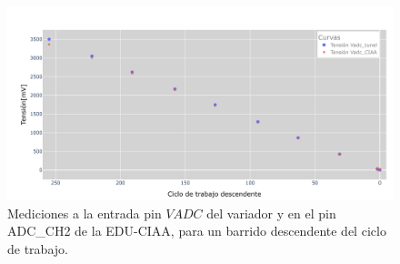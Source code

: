 \begin{figure}[H]
    \centering
    \includegraphics[width=1\linewidth]{Figuras/datalogger/Hardware/MedicionesPWM/pruebaTunelCiaaDes.png}
    \caption{Mediciones a la entrada pin $VADC$ del variador y en el pin ADC\_CH2 de la EDU-CIAA, para un barrido descendente del ciclo de trabajo.}
    \label{fig:pruebaTunelCiaaDes}
\end{figure}
